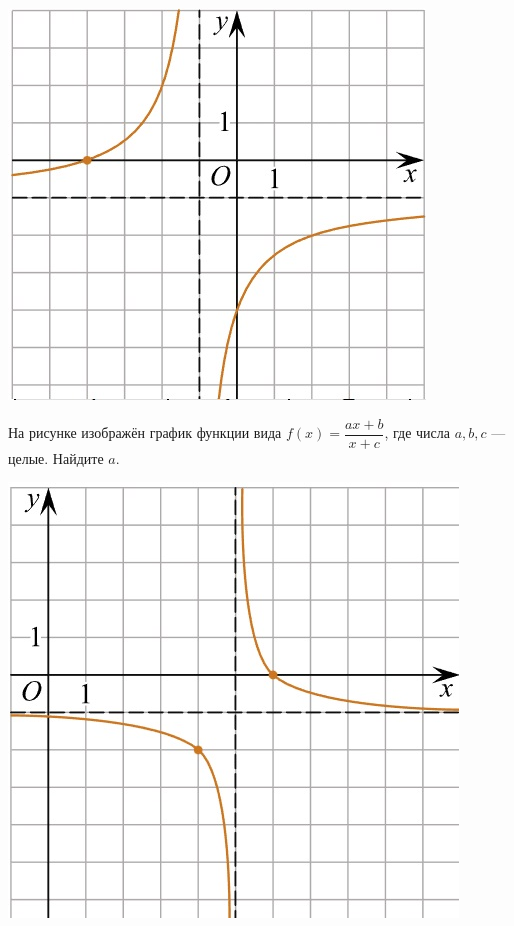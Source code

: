 \begin{class}[number=5]
\begin{listofex}
\begin{minipage}[c]{0.1\textwidth}
			\includegraphics[align=t, width=\textwidth]{pics/G101M4C5-3.jpg}
		\end{minipage}
		\item
		\begin{minipage}[t]{0.43\textwidth}
			На рисунке изображён график функции вида \(f(x)=\dfrac{ax+b}{x+c}\), где числа \(a, b, c\) --- целые. Найдите \(a\).
		\end{minipage}
		\begin{minipage}[c]{0.1\textwidth}
			\includegraphics[align=t, width=\textwidth]{pics/G101M4C5-5.jpg}

\end{minipage}
\end{listofex}
\end{class}
